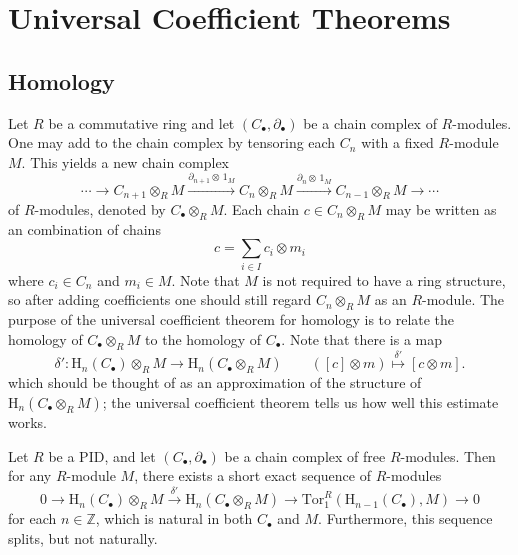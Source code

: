 \section{Universal Coefficient Theorems}



\subsection{Homology}

Let $R$ be a commutative ring and let $(C_\bullet, \partial_\bullet)$ be a chain complex of $R$-modules. One may add  to the chain complex by tensoring each $C_n$ with a fixed $R$-module $M$. This yields a new chain complex
\begin{equation*}
    \cdots \to C_{n+1} \otimes_R M \xrightarrow{\partial_{n+1} \otimes\, 1_M} C_n \otimes_R M \xrightarrow{\partial_n \otimes\, 1_M} C_{n-1} \otimes_R M \to \cdots
\end{equation*}
of $R$-modules, denoted by $C_\bullet \otimes_R M$. Each chain $c \in C_n \otimes_R M$ may be written as an  combination of chains
\begin{equation*}
    c = \sum_{i \in I} c_i \otimes m_i
\end{equation*}
where $c_i \in C_n$ and $m_i \in M$. Note that $M$ is not required to have a ring structure, so after adding coefficients one should still regard $C_n \otimes_R M$ as an $R$-module.  The purpose of the universal coefficient theorem for homology is to relate the homology of $C_\bullet \otimes_R M$ to the homology of $C_\bullet$. Note that there is a map
\begin{equation*}
    \delta' \colon \mathrm{H}_n(C_\bullet) \otimes_R M \to \mathrm{H}_n(C_\bullet \otimes_R M) \quad \quad ([c] \otimes m) \overset{\delta'}{\mapsto} [c \otimes m].
\end{equation*}
which should be thought of as an approximation of the structure of $\mathrm{H}_n(C_\bullet \otimes_R M)$; the universal coefficient theorem tells us how well this estimate works.

\begin{theorem}
    Let $R$ be a PID, and let $(C_\bullet, \partial_\bullet)$ be a chain complex of free $R$-modules. Then for any $R$-module $M$, there exists a short exact sequence of $R$-modules 
    \begin{equation*}\label{eq:uct-homology}
        0 \to \mathrm{H}_n(C_\bullet) \otimes_R M \overset{\delta'}{\to} \mathrm{H}_n(C_\bullet \otimes_R M) \to \mathrm{Tor}_1^R(\mathrm{H}_{n-1}(C_\bullet), M) \to 0 \tag{$\star$}
    \end{equation*}
    for each $n \in \mathbb{Z}$, which is natural in both $C_\bullet$ and $M$. Furthermore, this sequence splits, but not naturally.
\end{theorem}

